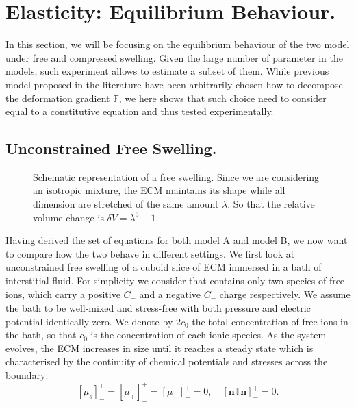 \documentclass[runningheads]{llncs}
\newcommand{\F}{\ensuremath{\mathbb{F}}}
\begin{document}
\section{Elasticity: Equilibrium Behaviour.}
In this section, we will be focusing on the equilibrium behaviour of the two model under free and compressed swelling. Given the large number of parameter in the models, such experiment allows to estimate a subset of them. While previous model proposed in the literature have been arbitrarily chosen how to decompose the deformation gradient $\F$, we here shows that such choice need to consider equal to a constitutive equation and thus tested experimentally. 

\subsection{Unconstrained Free Swelling.} 
\label{free}
\begin{figure}
	\centering
	\def\svgwidth{0.95\linewidth}
	
	\caption{Schematic representation of a free swelling. Since we are considering an isotropic mixture, the ECM maintains its shape while all dimension are stretched of the same amount $\lambda$. So that the relative volume change is $\delta V = \lambda^3-1$. }
\end{figure}

Having derived the set of equations for both model A and model B, we now want to compare how the two behave in different settings. We first look at unconstrained free swelling of a cuboid slice of ECM immersed in a bath of interstitial fluid. For simplicity we consider that contains only two species of free ions, which carry a positive $C_+$ and a negative $C_-$ charge respectively. We assume the bath to be well-mixed and stress-free with both pressure and electric potential identically zero. We denote by $2c_0$ the total concentration of free ions in the bath, so that $c_0$ is the concentration of each ionic species. As the system evolves, the ECM increases in size until it reaches a steady state which is characterised by the continuity of chemical potentials and stresses across the boundary:
\begin{equation}
\left[\mu_s\right]^+_-=\left[\mu_+\right]^+_-=\left[\mu_-\right]^+_-=0, \quad \left[\mathbf{n} \mathbb{T}\mathbf{n}\right]^+_-=0.
\end{equation}
\end{document}
